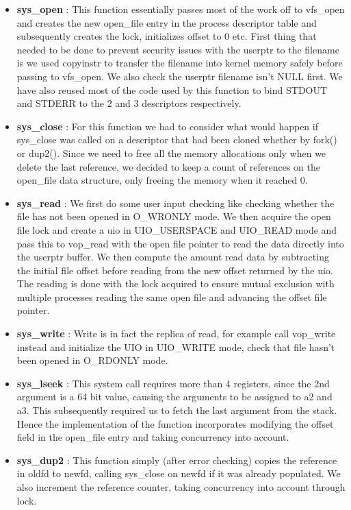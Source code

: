 \documentclass[a4paper]{article}
\begin{document}
\begin{itemize}
	\item \textbf{sys\_open} : This function essentially passes most of the work off to vfs\_open and creates the new open\_file entry in the process descriptor table and subsequently creates the lock, initializes offset to 0 etc. First thing that needed to be done to prevent security issues with the userptr to the filename is we used copyinstr to transfer the filename into kernel memory safely before passing to vfs\_open. We also check the userptr filename isn’t NULL first. We have also reused most of the code used by this function to bind STDOUT and STDERR to the 2 and 3 descriptors respectively.
	
	\item \textbf{sys\_close} : For this function we had to consider what would happen if sys\_close was called on a descriptor that had been cloned whether by fork() or dup2(). Since we need to free all the memory allocations only when we delete the last reference, we decided to keep a count of references on the open\_file data structure, only freeing the memory when it reached 0.
	
	\item \textbf{sys\_read} : We first do some user input checking like checking whether the file has not been opened in O\_WRONLY mode. We then acquire the open file lock and create a uio in UIO\_USERSPACE and UIO\_READ mode and pass this to vop\_read with the open file pointer to read the data directly into the userptr buffer. We then compute the amount read data by subtracting the initial file offset before reading from the new offset returned by the uio. The reading is done with the lock acquired to ensure mutual exclusion with multiple processes reading the same open file and advancing the offset file pointer.
	
	\item \textbf{sys\_write} : Write is in fact the replica of read, for example call vop\_write instead and initialize the UIO in UIO\_WRITE mode, check that file hasn’t been opened in O\_RDONLY mode.
	
	\item \textbf{sys\_lseek} : This system call requires more than 4 registers, since the 2nd argument is a 64 bit value, causing the arguments to be assigned to a2 and a3. This subsequently required us to fetch the last argument from the stack. Hence the implementation of the function incorporates modifying the offset field in the open\_file entry and taking concurrency into account.
	
	\item \textbf{sys\_dup2} : This function simply (after error checking) copies the reference in oldfd to newfd, calling sys\_close on newfd if it was already populated. We also increment the reference counter, taking concurrency into account through lock.
\end{itemize}
\end{document}
